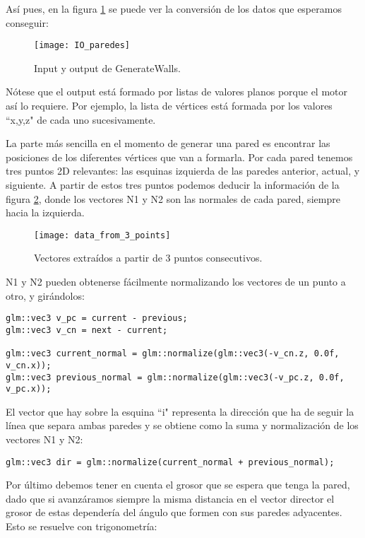 Así pues, en la figura \ref{fig:io_generatewalls} se puede ver la conversión de los datos que esperamos conseguir:

\begin{figure}[H]
    \centering
    \texttt{[image: IO\_paredes]}
    \caption{Input y output de GenerateWalls.}
    \label{fig:io_generatewalls}
\end{figure}

Nótese que el output está formado por listas de valores planos porque el motor así lo requiere. Por ejemplo, la lista de vértices está formada por los valores ``x,y,z" de cada uno  sucesivamente.

La parte más sencilla en el momento de generar una pared es encontrar las posiciones de los diferentes vértices que van a formarla. Por cada pared tenemos tres puntos 2D relevantes: las esquinas izquierda de las paredes anterior, actual, y siguiente. A partir de estos tres puntos podemos deducir la información de la figura \ref{fig:wall_vectors}, donde los vectores N1 y N2 son las normales de cada pared, siempre hacia la izquierda.

\begin{figure}[H]
    \centering
    \texttt{[image: data\_from\_3\_points]}
    \caption{Vectores extraídos a partir de 3 puntos consecutivos.}
    \label{fig:wall_vectors}
\end{figure}

N1 y N2 pueden obtenerse fácilmente normalizando los vectores de un punto a otro, y girándolos:

\begin{lstlisting}
glm::vec3 v_pc = current - previous;
glm::vec3 v_cn = next - current;

glm::vec3 current_normal = glm::normalize(glm::vec3(-v_cn.z, 0.0f, v_cn.x));
glm::vec3 previous_normal = glm::normalize(glm::vec3(-v_pc.z, 0.0f, v_pc.x));
\end{lstlisting}

El vector que hay sobre la esquina ``i" representa la dirección que ha de seguir la línea que separa ambas paredes y se obtiene como la suma y normalización de los vectores N1 y N2:

\begin{lstlisting}
glm::vec3 dir = glm::normalize(current_normal + previous_normal);
\end{lstlisting}

Por último debemos tener en cuenta el grosor que se espera que tenga la pared, dado que si avanzáramos siempre la misma distancia en el vector director el grosor de estas dependería del ángulo que formen con sus paredes adyacentes. Esto se resuelve con trigonometría:

